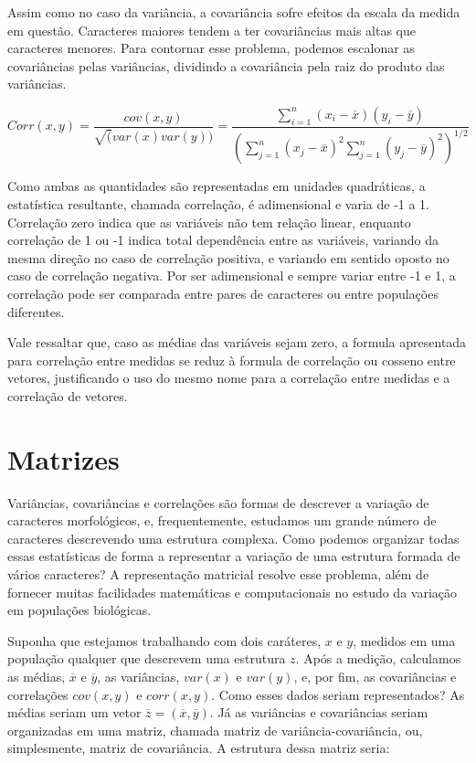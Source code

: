 \documentclass[portuges,]{tufte-handout}
\begin{document}
Assim como no caso da variância, a covariância sofre efeitos da escala
da medida em questão. Caracteres maiores tendem a ter covariâncias mais
altas que caracteres menores. Para contornar esse problema, podemos
escalonar as covariâncias pelas variâncias, dividindo a covariância pela
raiz do produto das variâncias.

\[
Corr(x, y) = \frac{cov(x, y)}{\sqrt(var(x)var(y))} = \frac{\sum_{i=1}^n (x_i - \overline x)(y_i - \overline y)}{(\sum_{j=1}^n (x_j - \overline x)^2\sum_{j=1}^n(y_j - \overline y)^2)^{1/2}}
\]

Como ambas as quantidades são representadas em unidades quadráticas, a
estatística resultante, chamada correlação, é adimensional e varia de -1
a 1. Correlação zero indica que as variáveis não tem relação linear,
enquanto correlação de 1 ou -1 indica total dependência entre as
variáveis, variando da mesma direção no caso de correlação positiva, e
variando em sentido oposto no caso de correlação negativa. Por ser
adimensional e sempre variar entre -1 e 1, a correlação pode ser
comparada entre pares de caracteres ou entre populações diferentes.

Vale ressaltar que, caso as médias das variáveis sejam zero, a formula
apresentada para correlação entre medidas se reduz à formula de
correlação ou cosseno entre vetores, justificando o uso do mesmo nome
para a correlação entre medidas e a correlação de vetores.

\section{Matrizes}\label{matrizes}

Variâncias, covariâncias e correlações são formas de descrever a
variação de caracteres morfológicos, e, frequentemente, estudamos um
grande número de caracteres descrevendo uma estrutura complexa. Como
podemos organizar todas essas estatísticas de forma a representar a
variação de uma estrutura formada de vários caracteres? A representação
matricial resolve esse problema, além de fornecer muitas facilidades
matemáticas e computacionais no estudo da variação em populações
biológicas.

Suponha que estejamos trabalhando com dois caráteres, \(x\) e \(y\),
medidos em uma população qualquer que descrevem uma estrutura \(z\).
Após a medição, calculamos as médias, \(\overline x\) e \(\overline y\),
as variâncias, \(var(x)\) e \(var(y)\), e, por fim, as covariâncias e
correlações \(cov(x, y)\) e \(corr(x, y)\). Como esses dados seriam
representados? As médias seriam um vetor
\(\overline z = (\overline x, \overline y)\). Já as variâncias e
covariâncias seriam organizadas em uma matriz, chamada matriz de
variância-covariância, ou, simplesmente, matriz de covariância. A
estrutura dessa matriz seria:
\end{document}
